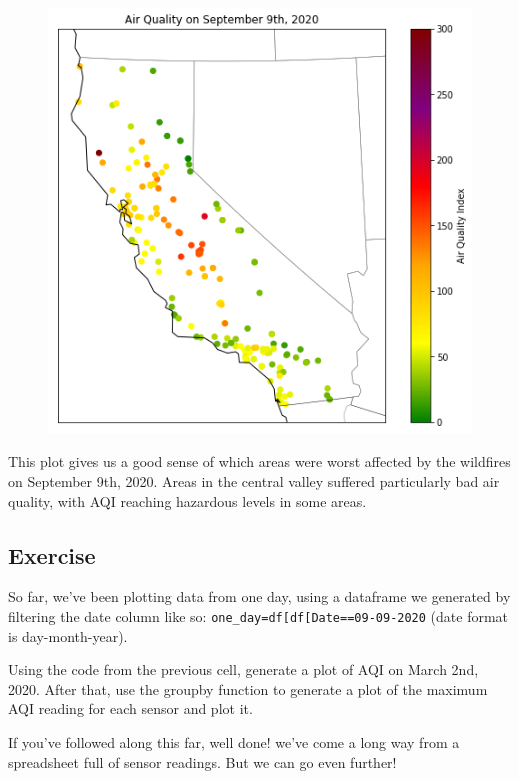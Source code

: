 \documentclass[
  letterpaper,
  DIV=11,
  numbers=noendperiod]{scrreprt}
\begin{document}
\begin{figure}[H]

{\centering \includegraphics{notebooks/W03. Spatial Data_files/figure-pdf/cell-19-output-1.png}

}

\end{figure}

This plot gives us a good sense of which areas were worst affected by
the wildfires on September 9th, 2020. Areas in the central valley
suffered particularly bad air quality, with AQI reaching hazardous
levels in some areas.

\hypertarget{exercise-6}{%
\subsection{Exercise}\label{exercise-6}}

So far, we've been plotting data from one day, using a dataframe we
generated by filtering the date column like so:
\texttt{one\_day=df{[}df{[}\textquotesingle{}Date\textquotesingle{}{]}==\textquotesingle{}09-09-2020\textquotesingle{}{]}}
(date format is day-month-year).

Using the code from the previous cell, generate a plot of AQI on March
2nd, 2020. After that, use the groupby function to generate a plot of
the maximum AQI reading for each sensor and plot it.

If you've followed along this far, well done! we've come a long way from
a spreadsheet full of sensor readings. But we can go even further!
\end{document}
